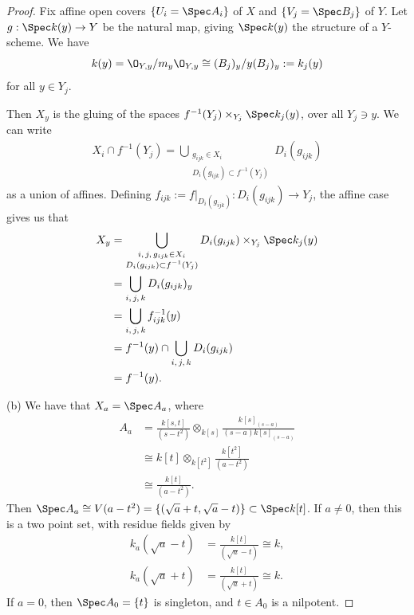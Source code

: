 \documentclass[12pt]{amsart}
\begin{document}
\begin{proof}
  Fix affine open covers $\{U_i=\Spec A_i\}$ of $X$ and $\{V_j=\Spec B_j\}$ of $Y$.
  Let $g:\Spec k(y)\to Y$ be the natural map, giving $\Spec k(y)$ the structure of a $Y$-scheme.
  We have 
  \[
    k(y)= \O_{Y,y}/m_y\O_{Y,y}\cong (B_j)_y/y(B_j)_y := k_j(y)
  \] 
  for all $y\in Y_j$.

  Then $X_y$ is the gluing of the spaces $f^{-1}(Y_j)\times_{Y_j} \Spec k_j(y)$, over all $Y_j\ni y$.
  We can write 
  \begin{align*}
    X_i\cap f^{-1}(Y_j)= \bigcup_{\substack{g_{i j k}\in X_i \\ D_i(g_{i j k})\subset f^{-1}(Y_j)}} D_i(g_{ij k})
  \end{align*}
  as a union of affines.
  Defining $f_{i j k}:=f|_{D_i(g_{i j k})}:D_i(g_{ i j k})\to Y_j$, the affine case gives us that
  \begin{align*}
    X_y &= \bigcup_{\substack{i,\,j,\, g_{ij k}\in X_i \\ D_i(g_{i j k})\subset f^{-1}(Y_j)}}
    D_i(g_{i j k})\times_{Y_j} \Spec k_j(y) \\
        &= \bigcup_{i,\, j,\, k} D_i(g_{i j k})_y \\
        &= \bigcup_{i,\, j,\, k} f_{i j k}^{-1}(y) \\
        &= f^{-1}(y)\cap \bigcup_{i, \, j, \,k} D_i(g_{ij k}) \\
        &= f^{-1}(y).
  \end{align*}

  (b) We have that $X_a=\Spec A_a$, where
  \begin{align*}
    A_a &= \frac{k[s,t]}{(s-t^2)}\otimes_{k[s]}\frac{k[s]_{(s-a)}}{(s-a)k[s]_{(s-a)}} \\
        &\cong k[t]\otimes_{k[t^2]}\frac{k[t^2]}{(a-t^2)} \\
        &\cong \frac{k[t]}{(a-t^2)}.
  \end{align*}
  Then $\Spec A_a\cong V(a-t^2)=\{(\sqrt{a}+ t,\sqrt{a}-t)\}\subset \Spec k[t]$.
  If $a\neq 0$, then this is a two point set, with residue fields given by
  \begin{align*}
    k_a(\sqrt{a}-t) &=\frac{k[t]}{(\sqrt{a}-t)}\cong k,\\
    k_a(\sqrt{a}+t) &=\frac{k[t]}{(\sqrt{a}+t)}\cong k.
  \end{align*}
  If $a=0$, then $\Spec A_0=\{t\}$ is singleton, and $t\in A_0$ is a nilpotent.


\end{proof}
\end{document}
